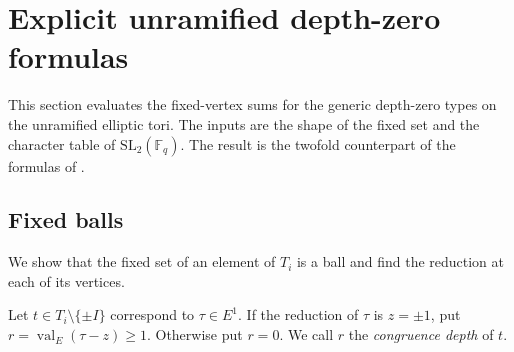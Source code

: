 \documentclass[12pt,letterpaper]{article}
\numberwithin{equation}{section}
\theoremstyle{definition}
\theoremstyle{remark}
\newcommand{\kk}{\mathbb F_q}
\newcommand{\val}{\operatorname{val}}
\begin{document}
\section{Explicit unramified depth-zero formulas}\label{sec:depthzero}
This section evaluates the fixed-vertex sums for the generic depth-zero types on the unramified elliptic tori. The inputs are the shape of the fixed set and the character table of $\mathrm{SL}_2(\kk)$. The result is the twofold counterpart of the formulas of \cite{Jo26}.

\subsection{Fixed balls}
We show that the fixed set of an element of $T_i$ is a ball and find the reduction at each of its vertices.

Let $t\in T_i\setminus\{\pm I\}$ correspond to $\tau\in E^1$. If the reduction of $\tau$ is $z=\pm1$, put $r=\val_E(\tau-z)\ge1$. Otherwise put $r=0$. We call $r$ the \emph{congruence depth} of $t$.
\end{document}

